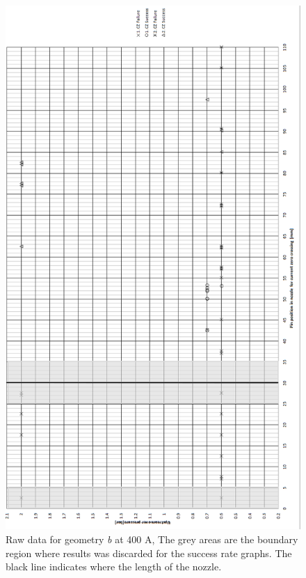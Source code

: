 \documentclass[10pt,a4paper]{article}
\begin{document}
\begin{figure}[H]
\centering
\includegraphics[scale=0.55]{Bilder/Results/rawData400AgeoB.png}
\caption{Raw data for geometry \textit{b} at 400 A, The grey areas are the boundary region where results was discarded for the success rate graphs. The black line indicates where the length of the nozzle.} \label{fig:rawData400AgeoB}
\end{figure}
\newpage
\end{document}
